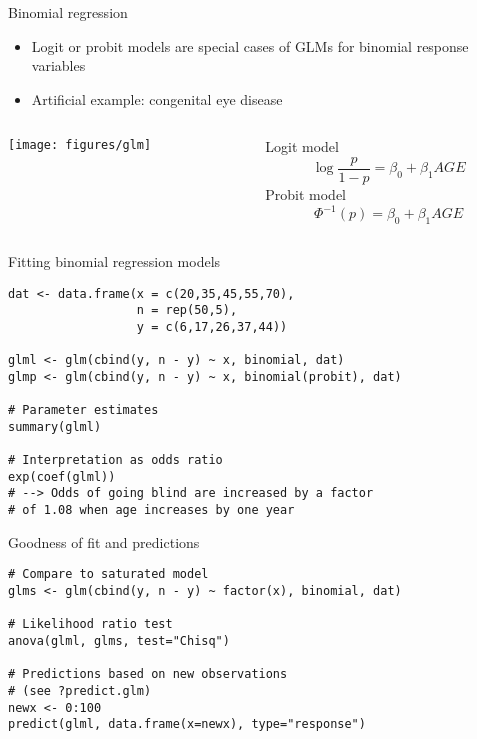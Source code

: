 \documentclass[aspectratio=169]{beamer}
\begin{document}
\begin{frame}{Binomial regression}
  \begin{itemize}
    \item Logit or probit models are special cases of GLMs for binomial
      response variables
    \item Artificial example: congenital eye disease
  \end{itemize}
\begin{columns}[c]
\begin{column}{6cm}
  \texttt{[image: figures/glm]}
\end{column}
\begin{column}{5cm}
Logit model
\[
  \log\frac{p}{1 - p} = \beta_0 + \beta_1 AGE
\]
Probit model
\[
  \Phi^{-1}(p) = \beta_0 + \beta_1 AGE
\]
\end{column}
\end{columns}
\end{frame}

{

\begin{frame}[fragile]{Fitting binomial regression models}
\begin{lstlisting}
dat <- data.frame(x = c(20,35,45,55,70), 
                  n = rep(50,5),
                  y = c(6,17,26,37,44))

glml <- glm(cbind(y, n - y) ~ x, binomial, dat)
glmp <- glm(cbind(y, n - y) ~ x, binomial(probit), dat)

# Parameter estimates
summary(glml)

# Interpretation as odds ratio
exp(coef(glml))
# --> Odds of going blind are increased by a factor
# of 1.08 when age increases by one year
\end{lstlisting}
\end{frame}

\begin{frame}[fragile]{Goodness of fit and predictions}
\begin{lstlisting}
# Compare to saturated model
glms <- glm(cbind(y, n - y) ~ factor(x), binomial, dat)

# Likelihood ratio test
anova(glml, glms, test="Chisq")

# Predictions based on new observations
# (see ?predict.glm)
newx <- 0:100
predict(glml, data.frame(x=newx), type="response")
\end{lstlisting}
\end{frame}

}
\end{document}
